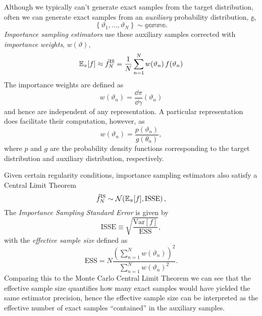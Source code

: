 Although we typically can't generate exact samples from the target 
distribution, often we can generate exact samples from an 
\emph{auxiliary} probability distribution, $\mathbb{\gamma}$,
%
\begin{equation*}
\left\{ \vartheta_{1}, \ldots, \vartheta_{N} \right\} \sim \mathbb{gamma}.
\end{equation*}
%
\emph{Importance sampling estimators} use these auxiliary samples 
corrected with \emph{importance weights}, $w \! \left( \vartheta \right)$,  
%
\begin{equation*}
\mathbb{E}_{\pi} [ f ] \approx 
\hat{f}^{\mathrm{IS}}_{N} = 
\frac{1}{N} \sum_{n = 1}^{N} 
w \! \left( \vartheta_{n} \right) f \! \left( \vartheta_{n} \right)
\end{equation*}
%
The importance weights are defined as
%
\begin{equation*}
w \! \left( \vartheta_{n} \right) =
\frac{ \dd \pi }{ \dd \gamma } \! \left( \vartheta_{n} \right)
\end{equation*}
%
and hence are independent of any representation.  A particular
representation does facilitate their computation, however, as
%
\begin{equation*}
w \! \left( \vartheta_{n} \right) =
\frac{ p \! \left( \vartheta_{n} \right) }
{ g \! \left( \theta_{n} \right) },
\end{equation*}
%
where $p$ and $g$ are the probability density functions corresponding 
to the target distribution and auxiliary distribution, respectively.

Given certain regularity conditions, importance sampling estimators 
also satisfy a Central Limit Theorem
%
\begin{equation*}
\hat{f}_{N}^{\mathrm{IS}} \sim 
\mathcal{N} \! \left( \mathbb{E}_{\pi} [ f ],
\mathrm{ISSE} \right),
\end{equation*}
%
The \emph{Importance Sampling Standard Error} is given by
%
\begin{equation*}
\mathrm{ISSE} \equiv \sqrt{ \frac{ \mathrm{Var} [ f ] }{\mathrm{ESS} } },
\end{equation*}
%
with the \emph{effective sample size} defined as
%
\begin{equation*}
\mathrm{ESS} = 
N 
\frac{ \left( \sum_{n = 1}^{N} w \! \left( \vartheta_{n} \right) \right)^{2} }
{ \sum_{n = 1}^{N} w \! \left( \vartheta_{n} \right)^{2} }.
\end{equation*}
%
Comparing this to the Monte Carlo Central Limit Theorem we can
see that the effective sample size quantifies how many exact
samples would have yielded the same estimator precision,
hence the effective sample size can be interpreted as the
effective number of exact samples ``contained'' in the auxiliary
samples.

